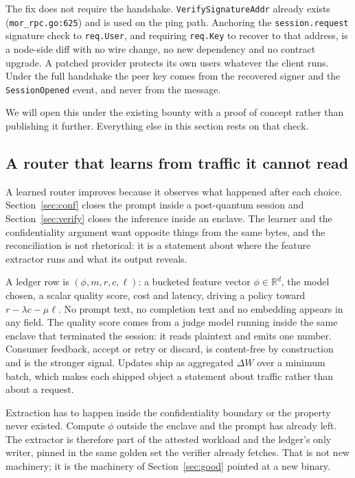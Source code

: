 \documentclass[11pt,a4paper]{article}
\newcommand{\code}[1]{\texttt{\small #1}}
\begin{document}
The fix does not require the handshake. \code{VerifySignatureAddr} already
exists (\code{mor\_rpc.go:625}) and is used on the ping path. Anchoring the
\code{session.request} signature check to \code{req.User}, and requiring
\code{req.Key} to recover to that address, is a node-side diff with no wire
change, no new dependency and no contract upgrade. A patched provider protects
its own users whatever the client runs. Under the full handshake the peer key
comes from the recovered signer and the \code{SessionOpened} event, and never
from the message.

We will open this under the existing bounty with a proof of concept rather than
publishing it further. Everything else in this section rests on that check.

\subsection{A router that learns from traffic it cannot read}
\label{sec:learn}

A learned router improves because it observes what happened after each choice.
Section~\ref{sec:conf} closes the prompt inside a post-quantum session and
Section~\ref{sec:verify} closes the inference inside an enclave. The learner and
the confidentiality argument want opposite things from the same bytes, and the
reconciliation is not rhetorical: it is a statement about where the feature
extractor runs and what its output reveals.

A ledger row is $(\phi, m, r, c, \ell)$: a bucketed feature vector
$\phi \in \mathbb{R}^{d}$, the model chosen, a scalar quality score, cost and
latency, driving a policy toward $r - \lambda c - \mu \ell$. No prompt text, no
completion text and no embedding appears in any field. The quality score comes
from a judge model running inside the same enclave that terminated the session:
it reads plaintext and emits one number. Consumer feedback, accept or retry or
discard, is content-free by construction and is the stronger signal. Updates
ship as aggregated $\Delta W$ over a minimum batch, which makes each shipped
object a statement about traffic rather than about a request.

Extraction has to happen inside the confidentiality boundary or the property
never existed. Compute $\phi$ outside the enclave and the prompt has already
left. The extractor is therefore part of the attested workload and the ledger's
only writer, pinned in the same golden set the verifier already fetches. That is
not new machinery; it is the machinery of Section~\ref{sec:good} pointed at a
new binary.
\end{document}
